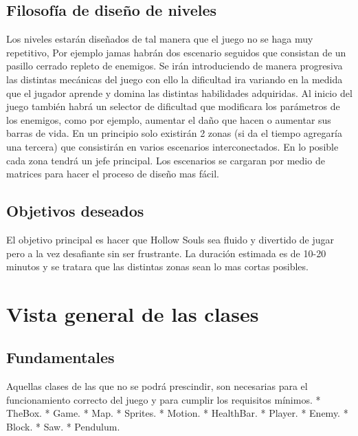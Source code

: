 \documentclass{article}
\begin{document}
\subsection{Filosofía de diseño de niveles}
Los niveles estarán diseñados de tal manera que el juego no se haga muy repetitivo, Por ejemplo jamas habrán dos escenario seguidos que consistan de un pasillo cerrado repleto de enemigos. \newline
Se irán introduciendo de manera progresiva las distintas mecánicas del juego con ello la dificultad ira variando en la medida que el jugador aprende y domina las distintas habilidades adquiridas. \newline
Al inicio del juego también habrá un selector de dificultad que modificara los parámetros de los enemigos, como por ejemplo, aumentar el daño que hacen o aumentar sus barras de vida.\newline
En un principio solo existirán 2 zonas (si da el tiempo agregaría una tercera) que consistirán en varios escenarios interconectados. En lo posible cada zona tendrá un jefe principal.\newline
Los escenarios se cargaran por medio de matrices para hacer el proceso de diseño mas fácil. 

\subsection{Objetivos deseados}
El objetivo principal es hacer que Hollow Souls sea fluido y divertido de jugar pero a la vez desafiante sin ser frustrante.\newline
La duración estimada es de 10-20 minutos y se tratara que las distintas zonas sean lo mas cortas posibles.\newline
\section{Vista general de las clases}

\subsection{Fundamentales}
Aquellas clases de las que no se podrá prescindir, son necesarias para el funcionamiento correcto del juego y para cumplir los requisitos mínimos.
\subitem 
* TheBox.\newline
* Game.\newline
* Map.\newline
* Sprites.\newline
* Motion.\newline
* HealthBar.\newline
* Player.\newline
* Enemy.\newline
* Block.\newline
* Saw.\newline
* Pendulum.\newline
\end{document}
